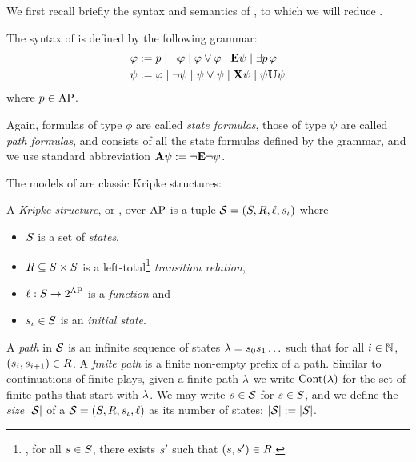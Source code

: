 We first recall briefly the syntax and semantics of \QCTLs, to which
we will reduce \SLref.



\begin{definition}%
  \label{def-syntax-QCTLs}
  The syntax of \QCTLs is defined by the following grammar:
  \begin{align*}
  \phi\egdef &\; p \mid \neg \phi \mid \phi\ou \phi \mid \E \psi \mid
  \existsp[p] \phi\\
    \psi\egdef &\; \phi \mid \neg \psi \mid \psi\ou \psi \mid \X \psi \mid
  \psi \until \psi
\end{align*}
where $p\in\APf$. 
\end{definition}

Again, formulas of type $\phi$ are called \emph{state formulas}, those of type $\psi$
are called \emph{path formulas}, and \QCTLs consists of all the state formulas
defined by the grammar, and   we use standard abbreviation 
$\A\psi \egdef \neg\E\neg\psi$.

The models of \QCTLs are classic Kripke structures:

\begin{definition}
A \emph{Kripke structure}, or \KS, over $\APf$ is a tuple 
$\KS=(\setstates,\relation,\lab,\sstate_\init)$ where
\begin{itemize}
\item $\setstates$  is a set of
\emph{states}, 
\item $\relation\subseteq\setstates\times\setstates$ is a
left-total\footnote{\ie, for all $\sstate\in\setstates$, there exists $\sstate'$
such that $(\sstate,\sstate')\in\relation$.} \emph{transition
relation}, 
\item $\lab:\setstates\to 2^{\APf}$ is a \emph{ function} and
\item $\sstate_\init \in \setstates$ is an \emph{initial state}.
\end{itemize}
\end{definition}

A \emph{path} in $\KS$  is an infinite sequence of states
$\spath=\sstate_{0}\sstate_{1}\ldots$ such that
 for all $i\in\setn$,
$(\sstate_{i},\sstate_{i+1})\in \relation$. 
A \emph{finite path} is a finite non-empty prefix of a path.
Similar to continuations of finite plays, given a finite path $\spath$ we write
$\setcontinuations{\spath}$ for the set of finite paths that start
with $\spath$.
We may write $\sstate\in\KS$ for $\sstate\in\setstates$, and we
define the \emph{size} $|\KS|$ of a \KS
$\KS=(\setstates,\relation,\sstate_\init,\lab)$ as its number of states: $|\KS|\egdef
|\setstates|$. 

